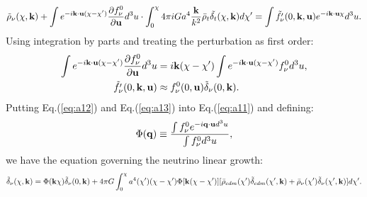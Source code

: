 \begin{equation}
\label{eq:a11}
    \Tilde{\rho}_\nu(\chi, \bold k) + \int e^{-i \bold k \cdot \bold u (\chi-\chi')} \pdv{f^0_\nu}{\bold u} d^3u \cdot \int^\chi_0 4\pi iGa^4  \frac{\bold k}{k^2}  \bar \rho_t \Tilde{\delta_t}(\chi, \bold k) d\chi' = \int \Tilde{f'_\nu}(0, \bold k, \bold u) e^{-i \bold k \cdot \bold u \chi} d^3u.
\end{equation}
Using integration by parts and treating the perturbation as first order:
\begin{align}
\label{eq:a12}
    \int e^{-i \bold k \cdot \bold u (\chi-\chi')} \pdv{f^0_\nu}{\bold u} d^3u &= i\bold k(\chi-\chi') \int e^{-i \bold k \cdot \bold u (\chi-\chi')} {f_\nu^0 d^3u}, \\
\label{eq:a13}
    \Tilde{f'_\nu}(0, \bold k, \bold u) &\approx f_\nu^0(0, \bold u) \Tilde{\delta}_\nu(0, \bold k).
\end{align}
Putting Eq.(\ref{eq:a12}) and Eq.(\ref{eq:a13}) into Eq.(\ref{eq:a11}) and defining:
\begin{equation}
    \Phi(\bold q) \equiv \frac{\int f^0_\nu e^{-i \bold q \cdot \bold u d^3u}}{\int f^0_\nu d^3u},
\end{equation}
we have the equation governing the neutrino linear growth:
\begin{equation}
    \Tilde{\delta}_\nu (\chi,\mathbf{k}) = \Phi(\mathbf{k}\chi) \Tilde{\delta}_\nu(0,\mathbf{k}) + 
    4\pi G \int^\chi_0 a^4(\chi')(\chi-\chi') \Phi[\mathbf{k}(\chi-\chi')]
    [\Bar{\rho}_{cdm}(\chi') \Tilde{\delta}_{cdm} (\chi',\mathbf{k}) + \Bar{\rho}_\nu(\chi') \Tilde{\delta}_\nu (\chi',\mathbf{k})] d\chi'.
\end{equation}

